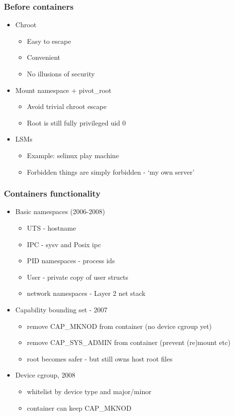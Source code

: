 \documentclass{beamer}
\begin{document}
\begin{frame}
\frametitle{Before containers}
  \begin{itemize}
    \item Chroot
      \begin{itemize}
        \item Easy to escape
        \item Convenient
        \item No illusions of security
      \end{itemize}
\pause
    \item Mount namespace + pivot\_root
  \begin{itemize}
  \item Avoid trivial chroot escape
  \item Root is still fully privileged uid 0
  \end{itemize}

\pause
    \item LSMs
      \begin{itemize}
        \item Example: selinux play machine
        \item Forbidden things are simply forbidden - `my own server'
      \end{itemize}
  \end{itemize}

\end{frame}

\begin{frame}
\frametitle{Containers functionality}
\begin{itemize}
\item Basic namespaces (2006-2008)
  \begin{itemize}
  \item UTS - hostname
  \item IPC - sysv and Posix ipc
  \item PID namespaces - process ids
  \item User - private copy of user structs
  \item network namespaces - Layer 2 net stack
  \end{itemize}

\item Capability bounding set - 2007
  \begin{itemize}
    \item remove CAP\_MKNOD from container (no device cgroup yet)
    \item remove CAP\_SYS\_ADMIN from container (prevent (re)mount etc)
    \item root becomes safer - but still owns host root files
  \end{itemize}

\item Device cgroup, 2008
  \begin{itemize}
  \item whitelist by device type and major/minor
  \item container can keep CAP\_MKNOD
  \end{itemize}
\end{itemize}
\end{frame}
\end{document}
